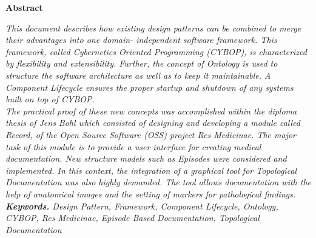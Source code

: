 %
%
%
%
%
%
%

\begin{center}
    \textbf{\large{Abstract}}
\end{center}
\normalsize
\textit{
This document describes how existing design patterns can be combined to merge
their advantages into one domain- independent software framework. This framework,
called Cybernetics Oriented Programming (CYBOP), is characterized by flexibility
and extensibility. Further, the concept of Ontology is used to structure the
software architecture as well as to keep it maintainable. A Component Lifecycle
ensures the proper startup and shutdown of any systems built on top of CYBOP.\\
The practical proof of these new concepts was accomplished within the diploma
thesis of Jens Bohl which consisted of designing and developing a module called
Record, of the Open Source Software (OSS) project Res Medicinae. The major task
of this module is to provide a user interface for creating medical documentation.
New structure models such as Episodes were considered and implemented. In this
context, the integration of a graphical tool for Topological Documentation was
also highly demanded. The tool allows documentation with the help of anatomical
images and the setting of markers for pathological findings.\\
\textbf{Keywords.} Design Pattern, Framework, Component Lifecycle, Ontology,
CYBOP, Res Medicinae, Episode Based Documentation, Topological Documentation
} \rm

